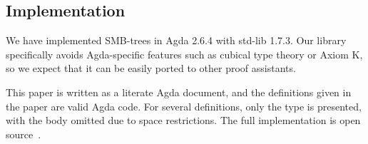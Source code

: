 \subsection{Implementation}

We have implemented SMB-trees in Agda 2.6.4 with std-lib 1.7.3.
Our library specifically avoids Agda-specific features
such as cubical type theory or Axiom K, so we expect
that it can be easily ported to other proof assistants.

This paper is written as a literate Agda document, and the definitions
given in the paper are valid Agda code.
For several definitions, only the type is presented, with the body omitted due to
space restrictions. The full implementation is open source~\citep{smbtreeZenodo}.

